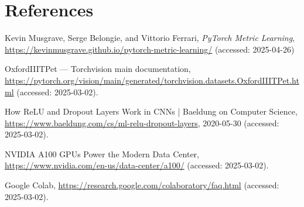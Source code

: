 \documentclass{CUP-JNL-DTM}
\theoremstyle{definition}
\numberwithin{equation}{section}
\begin{document}
\nocite{*} %

\newpage

\section{References} 
\renewcommand{\refname}{} %
\begin{thebibliography}{99}

Kevin Musgrave, Serge Belongie, and Vittorio Ferrari,
\emph{PyTorch Metric Learning},
\url{https://kevinmusgrave.github.io/pytorch-metric-learning/} (accessed: 2025-04-26)

OxfordIIITPet — Torchvision main documentation, \url{https://pytorch.org/vision/main/generated/torchvision.datasets.OxfordIIITPet.html} (accessed: 2025-03-02).

How ReLU and Dropout Layers Work in CNNs | Baeldung on Computer Science, \url{https://www.baeldung.com/cs/ml-relu-dropout-layers}, 2020-05-30 (accessed: 2025-03-02).

NVIDIA A100 GPUs Power the Modern Data Center, \url{https://www.nvidia.com/en-us/data-center/a100/} (accessed: 2025-03-02).

Google Colab, \url{https://research.google.com/colaboratory/faq.html} (accessed: 2025-03-02).




\end{thebibliography}
\end{document}
